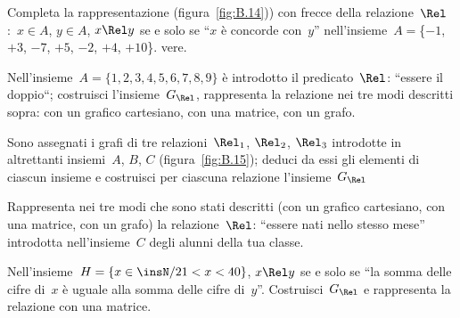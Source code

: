 

\begin{multicols}{2}
\begin{esercizio}
\label{ese:B.12}
Completa la rappresentazione (figura~\ref{fig:B.14})) con frecce della 
relazione~$\Rel$:~$x \in A$, $y \in A$, $x \Rel y$ se e solo se ``$x$ è 
concorde con~$y$''
nell'insieme~$A =$\{$-1$, $+3$, $-7$, $+5$, $-2$, $+4$, $+10$\}.
vere. 
\end{esercizio}

\begin{esercizio}
\label{ese:B.13}
Nell'insieme~$A = \{ 1, 2, 3, 4, 5, 6, 7, 8, 9 \}$ è introdotto il 
predicato~$\Rel$: ``essere il doppio``; costruisci l'insieme~$G_\Rel$, 
rappresenta la relazione nei tre modi descritti sopra: con un grafico 
cartesiano, con una matrice, con un grafo.
\end{esercizio}

\begin{esercizio}
\label{ese:B.14}
Sono assegnati i grafi di tre relazioni~$\Rel_1$, $\Rel_2$, $\Rel_3$ 
introdotte in altrettanti insiemi~$A$, $B$, $C$ (figura~\ref{fig:B.15}); 
deduci da essi gli elementi di ciascun insieme e costruisci per ciascuna 
relazione l'insieme~$G_\Rel$
\end{esercizio}

\begin{esercizio}
\label{ese:B.15}
Rappresenta nei tre modi che sono stati descritti (con un grafico cartesiano, 
con una matrice, con un grafo) la relazione~$\Rel$: 
``essere nati nello stesso mese'' introdotta nell'insieme~$C$ degli alunni 
della tua classe.
\end{esercizio}

\begin{esercizio}
\label{ese:B.16}
Nell'insieme~$H = \{ x \in \insN / 21 < x < 40 \}$, $x \Rel y$ se e solo se 
``la somma delle cifre di~$x$ è uguale alla somma delle cifre di~$y$''.
Costruisci~$G_\Rel$ e rappresenta la relazione con una matrice.
\end{esercizio}


\end{multicols}
